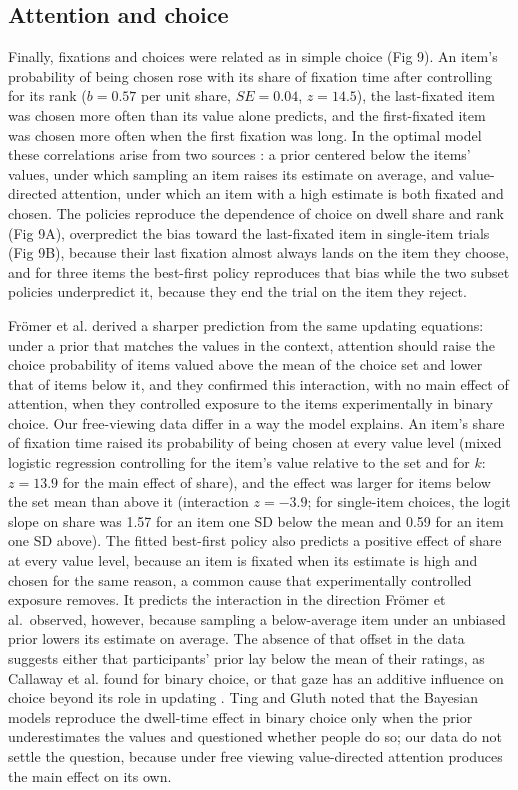\documentclass[10pt,letterpaper]{article}
\begin{document}
\subsection*{Attention and choice}\label{attention-and-choice}

Finally, fixations and choices were related as in simple choice (Fig 9).
An item's probability of being chosen rose with its share of fixation
time after controlling for its rank (\(b = 0.57\) per unit share,
\(SE = 0.04\), \(z = 14.5\)), the last-fixated item was chosen more
often than its value alone predicts, and the first-fixated item was
chosen more often when the first fixation was long. In the optimal model
these correlations arise from two sources \cite{callaway2021}: a prior
centered below the items' values, under which sampling an item raises
its estimate on average, and value-directed attention, under which an
item with a high estimate is both fixated and chosen. The policies
reproduce the dependence of choice on dwell share and rank (Fig 9A),
overpredict the bias toward the last-fixated item in single-item trials
(Fig 9B), because their last fixation almost always lands on the item
they choose, and for three items the best-first policy reproduces that
bias while the two subset policies underpredict it, because they end the
trial on the item they reject.

Frömer et al. \cite{fromer2025} derived a sharper prediction from the
same updating equations: under a prior that matches the values in the
context, attention should raise the choice probability of items valued
above the mean of the choice set and lower that of items below it, and
they confirmed this interaction, with no main effect of attention, when
they controlled exposure to the items experimentally in binary choice.
Our free-viewing data differ in a way the model explains. An item's
share of fixation time raised its probability of being chosen at every
value level (mixed logistic regression controlling for the item's value
relative to the set and for \(k\): \(z = 13.9\) for the main effect of
share), and the effect was larger for items below the set mean than
above it (interaction \(z = -3.9\); for single-item choices, the logit
slope on share was 1.57 for an item one SD below the mean and 0.59 for
an item one SD above). The fitted best-first policy also predicts a
positive effect of share at every value level, because an item is
fixated when its estimate is high and chosen for the same reason, a
common cause that experimentally controlled exposure removes. It
predicts the interaction in the direction Frömer et al.~observed,
however, because sampling a below-average item under an unbiased prior
lowers its estimate on average. The absence of that offset in the data
suggests either that participants' prior lay below the mean of their
ratings, as Callaway et al. \cite{callaway2021} found for binary choice,
or that gaze has an additive influence on choice beyond its role in
updating \cite{krajbich2010,smith2019}. Ting and Gluth \cite{ting2024}
noted that the Bayesian models reproduce the dwell-time effect in binary
choice only when the prior underestimates the values and questioned
whether people do so; our data do not settle the question, because under
free viewing value-directed attention produces the main effect on its
own.
\end{document}
